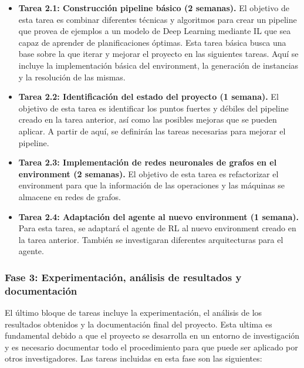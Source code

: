 \begin{itemize}
    \item \textbf{Tarea 2.1: Construcción pipeline básico (2 semanas).} El objetivo de esta tarea es combinar
          diferentes técnicas y algoritmos para crear un pipeline que provea de ejemplos a un modelo de
          Deep Learning mediante IL que sea capaz de aprender de planificaciones óptimas. Esta tarea básica busca
          una base sobre la que iterar y mejorar el proyecto en las siguientes tareas. Aquí se incluye la
          implementación básica del environment, la generación de instancias y la resolución de las mismas.
    \item \textbf{Tarea 2.2: Identificación del estado del proyecto (1 semana).} El objetivo de esta tarea es
          identificar los puntos fuertes y débiles del pipeline creado en la tarea anterior, así como
          las posibles mejoras que se pueden aplicar. A partir de aquí, se definirán las tareas
          necesarias para mejorar el pipeline.
    \item \textbf{Tarea 2.3: Implementación de redes neuronales de grafos en el environment (2 semanas).} El
          objetivo de esta tarea es refactorizar el environment para que la información de las operaciones
          y las máquinas se almacene en redes de grafos.
    \item \textbf{Tarea 2.4: Adaptación del agente al nuevo environment (1 semana).} Para esta tarea,
          se adaptará el agente de RL al nuevo environment creado en la tarea anterior. También se
          investigaran diferentes arquitecturas para el agente.
\end{itemize}

\subsubsection{Fase 3: Experimentación, análisis de resultados y documentación}
El último bloque de tareas incluye la experimentación, el análisis de los
resultados obtenidos y la documentación final del proyecto. Esta ultima es
fundamental debido a que el proyecto se desarrolla en un entorno de
investigación y es necesario documentar todo el procedimiento para que puede
ser aplicado por otros investigadores. Las tareas incluidas en esta fase son
las siguientes:

